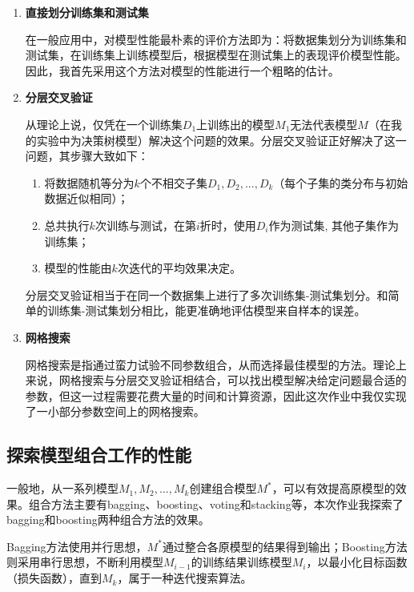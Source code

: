\documentclass[12pt,a4paper]{article}
\theoremstyle{definition}
\begin{document}
\begin{enumerate}
\item \textbf{直接划分训练集和测试集}

在一般应用中，对模型性能最朴素的评价方法即为：将数据集划分为训练集和测试集，在训练集上训练模型后，根据模型在测试集上的表现评价模型性能。因此，我首先采用这个方法对模型的性能进行一个粗略的估计。

\item \textbf{分层交叉验证}

从理论上说，仅凭在一个训练集$D_1$上训练出的模型$M_1$无法代表模型$M$（在我的实验中为决策树模型）解决这个问题的效果。分层交叉验证正好解决了这一问题，其步骤大致如下：

\begin{enumerate}
	\item 将数据随机等分为$k$个不相交子集$D_1, D_2, ... ,D_k$（每个子集的类分布与初始数据近似相同）；
	
	\item 总共执行$k$次训练与测试，在第$i$折时，使用$D_i$作为测试集, 其他子集作为训练集；
	
	\item 模型的性能由$k$次迭代的平均效果决定。
\end{enumerate}

分层交叉验证相当于在同一个数据集上进行了多次训练集-测试集划分。和简单的训练集-测试集划分相比，能更准确地评估模型来自样本的误差。

\item \textbf{网格搜索}

网格搜索是指通过蛮力试验不同参数组合，从而选择最佳模型的方法。理论上来说，网格搜索与分层交叉验证相结合，可以找出模型解决给定问题最合适的参数，但这一过程需要花费大量的时间和计算资源，因此这次作业中我仅实现了一小部分参数空间上的网格搜索。

\end{enumerate}

\subsection{探索模型组合工作的性能}

一般地，从一系列模型$M_1, M_2, ... , M_k$创建组合模型$M^*$，可以有效提高原模型的效果。组合方法主要有bagging、boosting、voting和stacking等，本次作业我探索了bagging和boosting两种组合方法的效果。

\vspace{0.01\linewidth}
Bagging方法使用并行思想，$M^*$通过整合各原模型的结果得到输出；Boosting方法则采用串行思想，不断利用模型$M_{i-1}$的训练结果训练模型$M_{i}$，以最小化目标函数（损失函数），直到$M_k$，属于一种迭代搜索算法。
\end{document}
